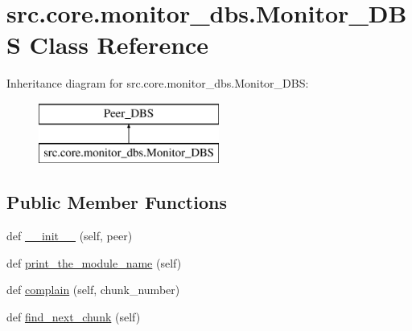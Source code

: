 \hypertarget{classsrc_1_1core_1_1monitor__dbs_1_1Monitor__DBS}{}\section{src.\+core.\+monitor\+\_\+dbs.\+Monitor\+\_\+\+D\+B\+S Class Reference}
\label{classsrc_1_1core_1_1monitor__dbs_1_1Monitor__DBS}
Inheritance diagram for src.\+core.\+monitor\+\_\+dbs.\+Monitor\+\_\+\+D\+B\+S\+:\begin{figure}[H]
\begin{center}
\leavevmode
\includegraphics[height=2.000000cm]{classsrc_1_1core_1_1monitor__dbs_1_1Monitor__DBS}
\end{center}
\end{figure}
\subsection*{Public Member Functions}
\begin{DoxyCompactItemize}
\item 
def \hyperlink{classsrc_1_1core_1_1monitor__dbs_1_1Monitor__DBS_a3897dc219b9cc6debd5e594fb2c4868e}{\+\_\+\+\_\+init\+\_\+\+\_\+} (self, peer)
\item 
def \hyperlink{classsrc_1_1core_1_1monitor__dbs_1_1Monitor__DBS_a5555b20bb26c70d2dfd74783c6a8f1c0}{print\+\_\+the\+\_\+module\+\_\+name} (self)
\item 
def \hyperlink{classsrc_1_1core_1_1monitor__dbs_1_1Monitor__DBS_a0d826b0dd76eae682d79c4b4939fe724}{complain} (self, chunk\+\_\+number)
\item 
def \hyperlink{classsrc_1_1core_1_1monitor__dbs_1_1Monitor__DBS_a7f2825bf8b6743ebee9fc61eb8a5ba91}{find\+\_\+next\+\_\+chunk} (self)
\end{DoxyCompactItemize}
